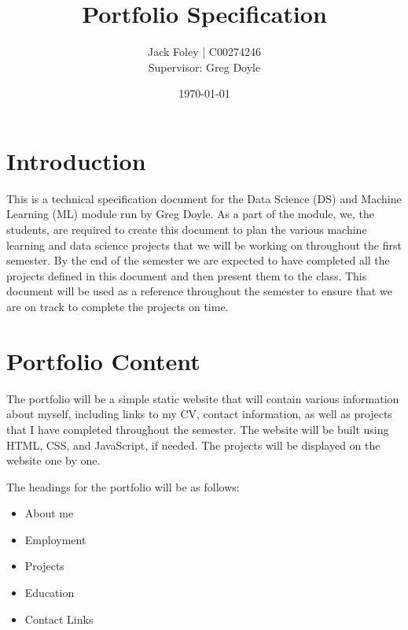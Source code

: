 \documentclass{article}
\title{Portfolio Specification}
\author{Jack Foley | C00274246 \\[1cm]Supervisor: Greg Doyle}
\date{\today}
\begin{document}
\maketitle
\newpage

\tableofcontents

\newpage

\section{Introduction}
This is a technical specification document for the Data Science (DS) and Machine Learning (ML) 
module run by Greg Doyle. As a part of the module, we, the students, are required to 
create this document to plan the various machine learning and data science projects 
that we will be working on throughout the first semester. By the end of the semester
we are expected to have completed all the projects defined in this document and then
present them to the class. This document will be used as a reference throughout the
semester to ensure that we are on track to complete the projects on time. 

\section{Portfolio Content}
The portfolio will be a simple static website that will contain various information about myself, including links to my CV, contact information, as well as projects 
that I have completed throughout the semester. The website will be built using HTML, CSS, and JavaScript, if needed. The projects will be displayed on the website one by one.

The headings for the portfolio will be as follows:
\begin{itemize}
    \item About me
    \item Employment
    \item Projects
    \item Education
    \item Contact Links
\end{itemize}
\end{document}
